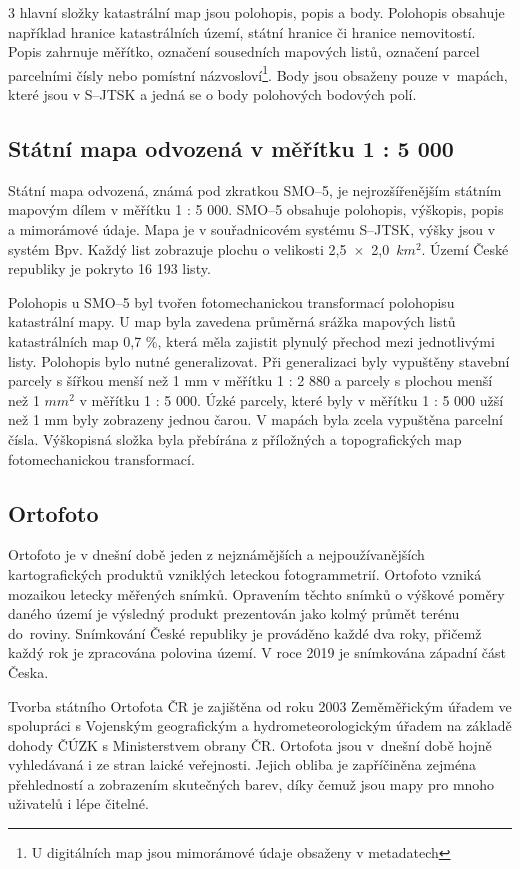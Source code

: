 \documentclass[thesis=M,czech]{FITthesis}[2012/06/26]
\begin{document}
3 hlavní složky katastrální map jsou polohopis, popis a body. Polohopis obsahuje například hranice katastrálních území, státní hranice či hranice nemovitostí. Popis zahrnuje měřítko, označení sousedních mapových listů, označení parcel parcelními čísly nebo pomístní názvosloví\footnote{U digitálních map jsou mimorámové údaje obsaženy v metadatech}. Body jsou obsaženy pouze v~mapách, které jsou v S–JTSK a jedná se o body polohových bodových polí. \cite{cuzk}

\subsection{Státní mapa odvozená v měřítku 1 : 5 000}
Státní mapa odvozená, známá pod zkratkou SMO–5, je nejrozšířenějším státním mapovým dílem v měřítku 1 : 5 000. SMO–5 obsahuje polohopis, výškopis, popis a mimorámové údaje. Mapa je v souřadnicovém systému S–JTSK, výšky jsou v systém Bpv. Každý list zobrazuje plochu o velikosti 2,5~$\times$~2,0~$km^{2}$. Území České republiky je pokryto 16 193 listy. 

Polohopis u SMO–5 byl tvořen fotomechanickou transformací polohopisu katastrální mapy. U map byla zavedena průměrná srážka mapových listů katastrálních map 0,7 \%, která měla zajistit plynulý přechod mezi jednotlivými listy. Polohopis bylo nutné generalizovat. Při generalizaci byly vypuštěny stavební parcely s šířkou menší než 1 mm v měřítku 1 : 2 880 a parcely s plochou menší než 1 $mm^{2}$ v měřítku 1 : 5 000. Úzké parcely, které byly v měřítku 1 : 5 000 užší než 1 mm byly zobrazeny jednou čarou. V mapách byla zcela vypuštěna parcelní čísla. Výškopisná složka byla přebírána z příložných a topografických map fotomechanickou transformací. \cite{cuzk} \cite{smo5_bp}




\subsection{Ortofoto}
Ortofoto je v dnešní době jeden z nejznámějších a nejpoužívanějších kartografických produktů vzniklých leteckou fotogrammetrií. Ortofoto vzniká mozaikou letecky měřených snímků. Opravením těchto snímků o výškové poměry daného území je výsledný produkt prezentován jako kolmý průmět terénu do~roviny. Snímkování České republiky je prováděno každé dva roky, přičemž každý rok je zpracována polovina území. V roce 2019 je snímkována západní část Česka.

Tvorba státního Ortofota ČR je zajištěna od roku 2003 Zeměměřickým úřadem ve spolupráci s Vojenským geografickým a hydrometeorologickým úřadem na základě dohody ČÚZK s Ministerstvem obrany ČR. Ortofota jsou v~dnešní době hojně vyhledávaná i ze stran laické veřejnosti. Jejich obliba je zapříčiněna zejména přehledností a zobrazením skutečných barev, díky čemuž jsou mapy pro mnoho uživatelů i lépe čitelné. \cite{cuzk} \cite{ortofoto}
\end{document}

